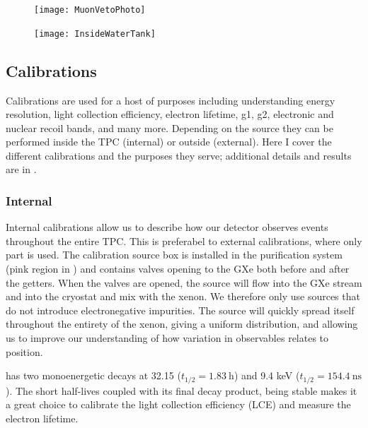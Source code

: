 \begin{figure}
\centering
\texttt{[image: MuonVetoPhoto]}
\label{fig:xenon1t_water_shield_photo}
\end{figure}

\begin{figure}
\centering
\texttt{[image: InsideWaterTank]}
\label{fig:xenon1t_water_shield_interior}
\end{figure}



\subsection{Calibrations}
\label{subsec:xenon1t_calibrations}
Calibrations are used for a host of purposes including understanding energy resolution, light collection efficiency, electron lifetime,
g1, g2, electronic and nuclear recoil bands, and many more.  Depending on the source they can be performed inside the TPC (internal) or
outside (external).  Here I cover the different calibrations and the purposes they serve; additional details and results are in
.

\subsubsection{Internal}
\label{subsubsec:xenon1t_calibrations_internal}
Internal calibrations allow us to describe how our detector observes events throughout the entire TPC.  This is preferabel to external
calibrations, where only part is used.  The calibration source box is installed in the purification system (pink region in
) and contains valves opening to the GXe both before and after the getters.  When the valves are opened,
the source will flow into the GXe stream and into the cryostat and mix with the xenon.  We therefore only use sources that do not introduce
electronegative impurities.  The source will quickly spread itself throughout the entirety of the xenon, giving a uniform distribution,
and allowing us to improve our understanding of how variation in observables relates to position.

\kryptonmeta has two monoenergetic decays at 32.15 ($t_{1/2} = 1.83\ \mathrm{h}$) and 9.4 keV ($t_{1/2} = 154.4\ \mathrm{ns}$).  The short
half-lives coupled with its final decay product,  being stable makes it a great choice to calibrate the light collection
efficiency (LCE) and measure the electron lifetime.

